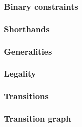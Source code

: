 \subsubsection{Binary constraints \lispTodo{}}   \label{hub: system: transaction phase flags: binarities}        
\subsubsection{Shorthands         \lispTodo{}}   \label{hub: system: transaction phase flags: shorthands}        
\subsubsection{Generalities       \lispTodo{}}   \label{hub: system: transaction phase flags: generalities}      
\subsubsection{Legality           \lispTodo{}}   \label{hub: system: transaction phase flags: legality}          
\subsubsection{Transitions        \lispTodo{}}   \label{hub: system: transaction phase flags: transition}        
\subsubsection{Transition graph   \lispTodo{}}   \label{hub: system: transaction phase flags: transition graph}  
